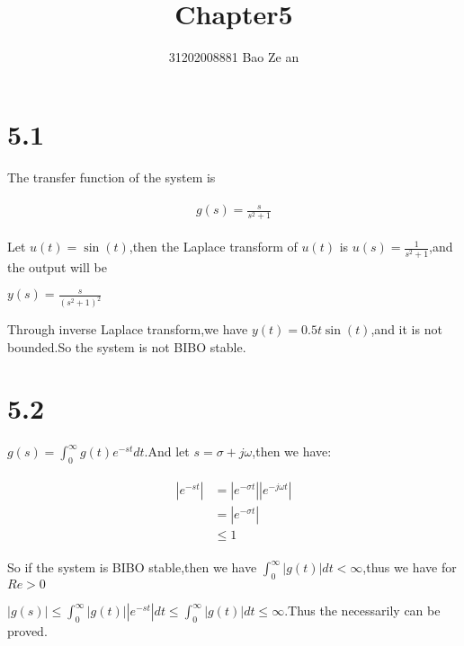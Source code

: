\documentclass{article}
\title{Chapter5}
\author{31202008881        \quad \quad \quad
          Bao Ze an}
\begin{document}
\setlength{\parindent}{2em}
\maketitle

\section*{5.1}
The transfer function of the system is \\
\begin{center}
    \begin{eqnarray*}\begin{split}
    g(s)=\frac{s}{s^2+1}
    \end{split}\end{eqnarray*}
\end{center}

Let $u(t)=\sin(t)$,then the Laplace transform of $u(t)$ is $u(s)=\frac{1}{s^2+1}$,and the output will be \\
\begin{center}
    $y(s)=\frac{s}{(s^2+1)^2}$
\end{center}

Through inverse Laplace transform,we have $y(t)=0.5t\sin(t)$,and it is not bounded.So the system is not BIBO stable.\\

\section*{5.2}
$g(s)=\int_0^\infty g(t)e^{-st} dt$.And let $s=\sigma +j\omega$,then we have:\\
\begin{center}
    \begin{eqnarray*}\begin{split}
    \left|e^{-st}\right|&=\left|e^{-\sigma t}\right|\left|e^{-j\omega t}\right|\\
    &=\left|e^{-\sigma t}\right|\\
    &\leq1
    \end{split}\end{eqnarray*}
\end{center}

So if the system is BIBO stable,then we have $\int_0^\infty \left|g(t)\right| dt < \infty$,thus we have for $Re>0$\\
\begin{center}
    $\left|g(s)\right|\leq \int_0^\infty \left|g(t)\right|\left|e^{-st}\right| dt\leq \int_0^\infty \left|g(t)\right| dt \leq \infty$.Thus the necessarily can be proved.
\end{center}
\end{document}
